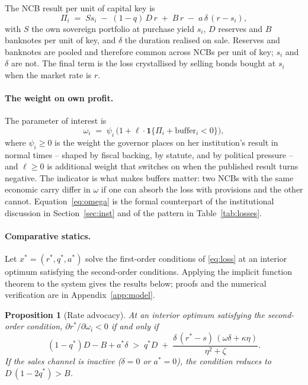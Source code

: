 \documentclass[11pt]{article}
\theoremstyle{plain}
\newtheorem{proposition}{Proposition}
\begin{document}
The NCB result per unit of capital key is
\begin{equation}\label{eq:pnl}
\Pi_i \;=\; S s_i \;-\; (1-q)\,D\,r \;+\; B\,r \;-\; a\,\delta\,(r - s_i),
\end{equation}
with $S$ the own sovereign portfolio at purchase yield $s_i$, $D$ reserves and $B$ banknotes per unit of key, and $\delta$ the duration realised on sale. Reserves and banknotes are pooled and therefore common across NCBs per unit of key; $s_i$ and $\delta$ are not. The final term is the loss crystallised by selling bonds bought at $s_i$ when the market rate is $r$.

\paragraph{The weight on own profit.}
The parameter of interest is
\begin{equation}\label{eq:omega}
\omega_i \;=\; \psi_i\,\bigl(1 + \ell\cdot\mathbf{1}\{\Pi_i + \text{buffer}_i < 0\}\bigr),
\end{equation}
where $\psi_i \geq 0$ is the weight the governor places on her institution's result in normal times -- shaped by fiscal backing, by statute, and by political pressure -- and $\ell \geq 0$ is additional weight that switches on when the published result turns negative. The indicator is what makes buffers matter: two NCBs with the same economic carry differ in $\omega$ if one can absorb the loss with provisions and the other cannot. Equation~\eqref{eq:omega} is the formal counterpart of the institutional discussion in Section~\ref{sec:inst} and of the pattern in Table~\ref{tab:losses}.

\paragraph{Comparative statics.}
Let $x^* = (r^*, q^*, a^*)$ solve the first-order conditions of \eqref{eq:loss} at an interior optimum satisfying the second-order conditions. Applying the implicit function theorem to the system gives the results below; proofs and the numerical verification are in Appendix~\ref{app:model}.

\begin{proposition}[Rate advocacy]\label{prop:rate}
At an interior optimum satisfying the second-order condition, $\partial r^*/\partial \omega_i < 0$ if and only if
\begin{equation}\label{eq:cond}
(1-q^*)D - B + a^*\delta \;>\; q^* D \;+\; \frac{\delta\,(r^*-s)\,(\omega\delta + \kappa\eta)}{\eta^2+\zeta}.
\end{equation}
If the sales channel is inactive ($\delta = 0$ or $a^*=0$), the condition reduces to $D\,(1-2q^*) > B$.
\end{proposition}
\end{document}
